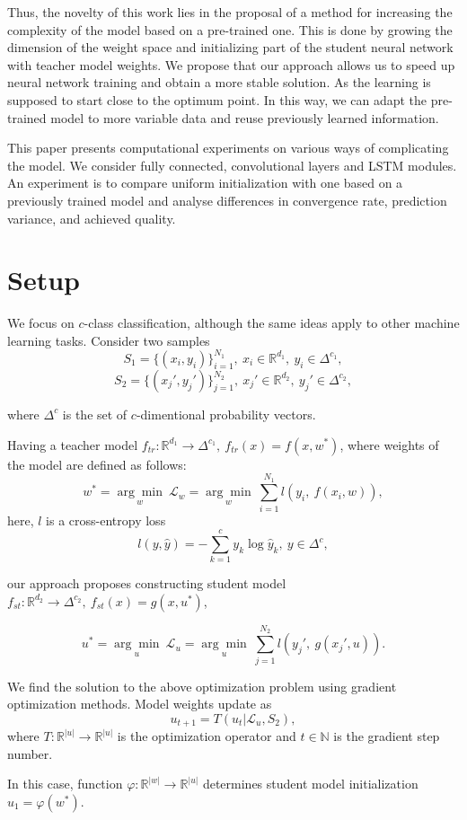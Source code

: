 \documentclass{article}
\begin{document}
Thus, the novelty of this work lies in the proposal of a method for increasing the complexity of the model based on a pre-trained one. This is done by growing the dimension of the weight space and initializing part of the student neural network with teacher model weights. We propose that our approach allows us to speed up neural network training and obtain a more stable solution. As the learning is supposed to start close to the optimum point. In this way, we can adapt the pre-trained model to more variable data and reuse previously learned information.

This paper presents computational experiments on various ways of complicating the model. We consider fully connected, convolutional layers and LSTM modules. An experiment is to compare uniform initialization with one based on a previously trained model and analyse differences in convergence rate, prediction variance, and achieved quality.

\section{Setup}
We focus on $c$-class classification, although the same ideas apply to other machine learning tasks. Consider two samples
$$S_1 = \{(x_i, y_i)\}_{i=1}^{N_1},~x_i \in \mathbb{R}^{d_1},~y_i \in \Delta^{c_1},$$
$$S_2 =  \{(x_j', y_j')\}_{j=1}^{N_2},~x_j' \in \mathbb{R}^{d_2},~y_j' \in \Delta^{c_2},$$

where $\Delta^c$ is the set of $c$-dimentional probability vectors.

Having a teacher model $f_{tr}: \mathbb{R}^{d_1} \rightarrow \Delta^{c_1},~f_{tr}(x) = f(x, w^*)$, where weights of the model are defined as follows:
$$w^* =  \underset{w}{\arg\min}~\mathcal{L}_w =\underset{w}{\arg\min}~\sum\limits_{i=1}^{N_1} l (y_i,~f(x_i, w)),$$
here, $l$ is a cross-entropy loss 
$$l(y, \hat{y}) = -\sum\limits_{k=1}^{c} y_k \log{\hat{y}_k},~y \in \Delta^c,$$

our approach proposes constructing student model $f_{st}: \mathbb{R}^{d_2} \rightarrow \Delta^{c_2},~f_{st}(x) = g(x, u^*)$,

$$u^* =  \underset{u}{\arg\min}~\mathcal{L}_u = \underset{u}{\arg\min}~\sum\limits_{j=1}^{N_2} l (y_j',~g(x_j', u)).$$

We find the solution to the above optimization problem using gradient optimization methods. Model weights update as
$$u_{t+1} = T(u_t | \mathcal{L}_u, S_2),$$
where $T: \mathbb{R}^{|u|} \rightarrow \mathbb{R}^{|u|}$ is the optimization operator and $t \in \mathbb{N}$ is the gradient step number.

In this case, function $\varphi: \mathbb{R}^{|w|} \rightarrow \mathbb{R}^{|u|}$ determines student model initialization $u_1 = \varphi(w^*)$.



\end{document}
